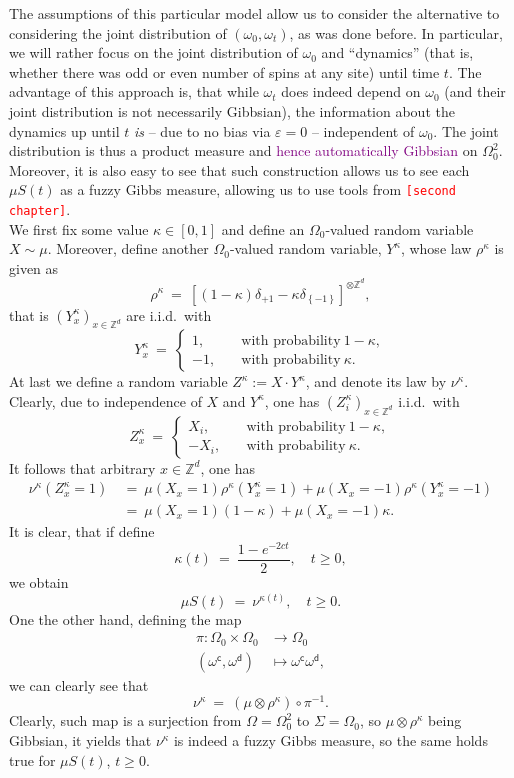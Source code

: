 \documentclass[12pt]{article}
\newcommand{\Z}{\mathbb{Z}}
\newcommand{\set}[1]{\left\{#1\right\}}
\newcommand{\oglati}[1]{\left[#1\right]}
\newcommand{\ra}{\rightarrow}
\newcommand{\1}{\mathbbm{1}}
\renewcommand{\c}{\mathsf{c}}
\newcommand{\5}{\vspace{0.5cm}}
\theoremstyle{definition}
\begin{document}
The assumptions of this particular model allow us to consider the alternative to considering the joint distribution of $(\omega_0,\omega_t)$, as was done before. In particular, we will rather focus on the joint distribution of $\omega_0$ and ``dynamics'' (that is, whether there was odd or even number of spins at any site) until time $t$. The advantage of this approach is, that while $\omega_t$ does indeed depend on $\omega_0$ (and their joint distribution is not necessarily Gibbsian), the information about the dynamics up until $t$ \textit{is} -- due to no bias via $\varepsilon=0$ -- independent of $\omega_0$. The joint distribution is thus a product measure and \textcolor{purple}{hence automatically Gibbsian} on $\Omega_0^2$. Moreover, it is also easy to see that such construction allows us to see each $\mu S(t)$ as a fuzzy Gibbs measure, allowing us to use tools from \textcolor{red}{\texttt{[second chapter]}}. \\

We first fix some value $\kappa\in[0,1]$ and define an $\Omega_0$-valued random variable $X\sim\mu$. Moreover, define another $\Omega_0$-valued random variable, $Y^\kappa$, whose law $\rho^\kappa$ is given as
$$\rho^\kappa ~=~ \oglati{(1-\kappa)\delta_{+1}-\kappa\delta_{\set{-1}}}^{\otimes\Z^d},$$
that is $(Y_x^\kappa)_{x\in\Z^d}$ are i.i.d.~with
$$Y_x^\kappa ~=~ \begin{cases}
1, \quad &\text{with probability}~1-\kappa,\\
-1, \quad &\text{with probability}~\kappa.	
\end{cases}$$
At last we define a random variable $Z^\kappa:=X\cdot Y^\kappa$, and denote its law by $\nu^\kappa$. Clearly, due to independence of $X$ and $Y^\kappa$, one has $(Z_i^\kappa)_{x\in\Z^d}$ i.i.d.~with 
$$Z_x^\kappa ~=~ \begin{cases}
X_i, \quad &\text{with probability}~1-\kappa,\\
-X_i, \quad &\text{with probability}~\kappa.
\end{cases}$$
It follows that arbitrary $x\in\Z^d$, one has
\begin{align*}
\nu^\kappa(Z_x^\kappa=1) ~&=~ \mu(X_x=1)\rho^\kappa(Y_x^\kappa=1) + \mu(X_x=-1)\rho^\kappa(Y_x^\kappa=-1) \\
&=~ \mu(X_x=1)(1-\kappa)+\mu(X_x=-1)\kappa.
\end{align*}
It is clear, that if define 
$$\kappa(t) ~=~ \frac{1-e^{-2ct}}{2}, \quad t\geq 0,$$
we obtain
$$\mu S(t) ~=~ \nu^{\kappa(t)}, \quad t\geq 0.$$
One the other hand, defining the map
\begin{align*}
\pi:\Omega_0\times\Omega_0&\ra\Omega_0 \\
(\omega^\c,\omega^\mathsf{d})&\mapsto\omega^\c\omega^\mathsf{d},
\end{align*}
we can clearly see that
$$\nu^{\kappa} ~=~ (\mu\otimes\rho^\kappa)\circ\pi^{-1}.$$
Clearly, such map is a surjection from $\Omega=\Omega_0^2$ to $\Sigma=\Omega_0$, so $\mu\otimes\rho^\kappa$ being Gibbsian, it yields that $\nu^\kappa$ is indeed a fuzzy Gibbs measure, so the same holds true for $\mu S(t)$, $t\geq 0$. \\
\end{document}
